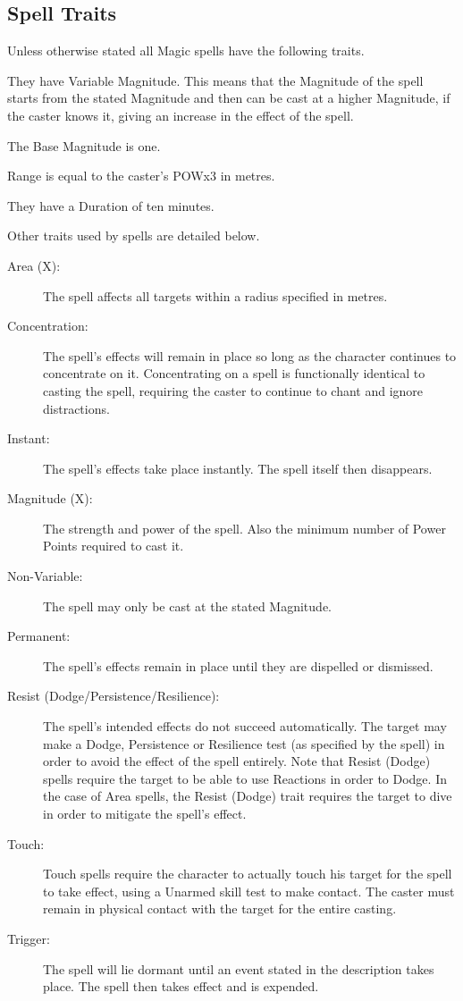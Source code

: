 \subsection{Spell Traits}
Unless otherwise stated all Magic spells have the following traits.

\begin{rpg-list}
\item They have Variable Magnitude. This means that the Magnitude of the spell starts from the stated Magnitude and then can be cast at a higher Magnitude, if the caster knows it, giving an increase in the effect of the spell. %
\item The Base Magnitude is one. 
\item Range is equal to the caster’s POWx3 in metres.
\item They have a Duration of ten minutes.
\end{rpg-list}

Other traits used by spells are detailed below. 
\begin{description}
	\item[Area (X):] The spell affects all targets within a radius specified in metres. 
	\item[Concentration:] The spell’s effects will remain in place so long as the character continues to concentrate on it. Concentrating on a spell is functionally identical to casting the spell, requiring the caster to continue to chant and ignore distractions. 
	\item[Instant:] The spell’s effects take place instantly. The spell itself then disappears. 
	\item[Magnitude (X):] The strength and power of the spell. Also the minimum number of Power Points required to cast it. 
	\item[Non-Variable:] The spell may only be cast at the stated Magnitude.
	\item[Permanent:] The spell’s effects remain in place until they are dispelled or dismissed. 
	\item[Resist (Dodge/Persistence/Resilience):] The spell’s intended effects do not succeed automatically. The target may make a Dodge, Persistence or Resilience test (as specified by the spell) in order to avoid the effect of the spell entirely. Note that Resist (Dodge) spells require the target to be able to use Reactions in order to Dodge. In the case of Area spells, the Resist (Dodge) trait requires the target to dive in order to mitigate the spell’s effect. 
	\item[Touch:] Touch spells require the character to actually touch his target for the spell to take effect, using a Unarmed skill test to make contact. The caster must remain in physical contact with the target for the entire casting.
	\item[Trigger:] The spell will lie dormant until an event stated in the description takes place. The spell then takes effect and is expended.
\end{description}



